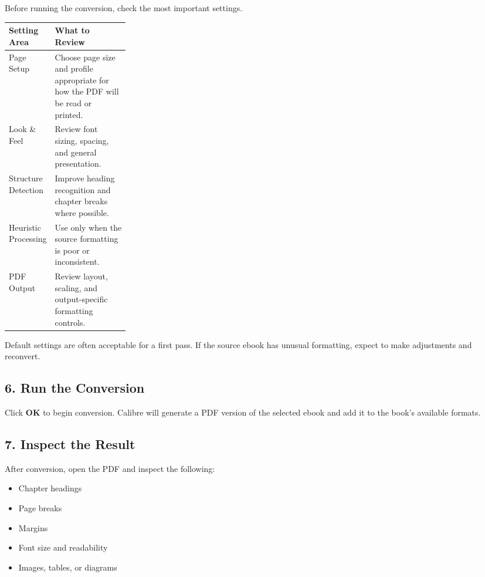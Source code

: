 \documentclass[11pt]{article}
\begin{document}
Before running the conversion, check the most important settings.

\noindent\begin{tabularx}{\linewidth}{@{}>{\raggedright\arraybackslash}p{0.24\linewidth} >{\raggedright\arraybackslash}X@{}}
\toprule
\textbf{Setting Area} & \textbf{What to Review} \\
\midrule
Page Setup & Choose page size and profile appropriate for how the PDF will be read or printed. \\
Look \& Feel & Review font sizing, spacing, and general presentation. \\
Structure Detection & Improve heading recognition and chapter breaks where possible. \\
Heuristic Processing & Use only when the source formatting is poor or inconsistent. \\
PDF Output & Review layout, scaling, and output-specific formatting controls. \\
\bottomrule
\end{tabularx}

\medskip

\noindent Default settings are often acceptable for a first pass. If the source ebook has unusual formatting, expect to make adjustments and reconvert.

\subsection{6. Run the Conversion}

Click \textbf{OK} to begin conversion. Calibre will generate a PDF version of the selected ebook and add it to the book's available formats.

\subsection{7. Inspect the Result}

After conversion, open the PDF and inspect the following:

\begin{itemize}
    \item Chapter headings
    \item Page breaks
    \item Margins
    \item Font size and readability
    \item Images, tables, or diagrams
\end{itemize}
\end{document}
